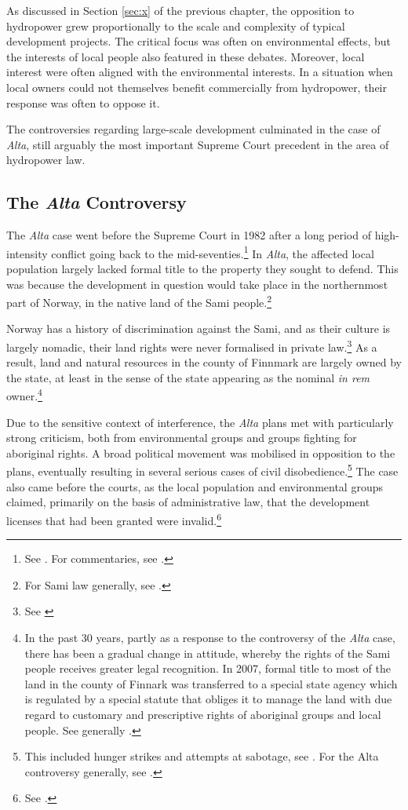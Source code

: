 As discussed in Section \ref{sec:x} of the previous chapter, the opposition to hydropower grew proportionally to the scale and complexity of typical development projects. The critical focus was often on environmental effects, but the interests of local people also featured in these debates. 
Moreover, local interest were often aligned with the environmental interests. In a situation when local owners could not themselves benefit commercially  from hydropower, their response was often to oppose it. 

The controversies regarding large-scale development culminated in the case of {\it Alta}, still arguably the most important Supreme Court precedent in the area of hydropower law.

\subsection{The {\it Alta} Controversy}\label{sec:alta}

The {\it Alta} case went before the Supreme Court in 1982 after a long period of high-intensity conflict going back to the mid-seventies.\footnote{See \cite{alta82}. For commentaries, see \cite{eckhoff82,boe83,hagvar88}.} In {\it Alta}, the affected local population largely lacked formal title to the property they sought to defend. This was because the development in question would take place in the northernmost part of Norway, in the native land of the Sami people.\footnote{For Sami law generally, see \cite{skogvang02}.}

Norway has a history of discrimination against the Sami, and as their culture is largely nomadic, their land rights were never formalised in private law.\footnote{See \cite[149-156]{ravna12s}} As a result, land and natural resources in the county of Finnmark are largely owned by the state, at least in the sense of the state appearing as the nominal {\it in rem} owner.\footnote{In the past 30 years, partly as a response to the controversy of the {\it Alta} case, there has been a gradual change in attitude, whereby the rights of the Sami people receives greater legal recognition. In 2007, formal title to most of the land in the county of Finnark was transferred to a special state agency which is regulated by a special statute that obliges it to manage the land with due regard to customary and prescriptive rights of aboriginal groups and local people. See generally \cite{bull08}.}

Due to the sensitive context of interference, the {\it Alta} plans met with particularly strong criticism, both from environmental groups and groups fighting for aboriginal rights. A broad political movement was mobilised in opposition to the plans, eventually resulting in several serious cases of civil disobedience.\footnote{This included hunger strikes and attempts at sabotage, see \cite[80-83]{nilsen08}. For the Alta controversy generally, see \cite{altawiki;hjorthol06}.} The case also came before the courts, as the local population and environmental groups claimed, primarily on the basis of administrative law, that the development licenses that had been granted were invalid.\footnote{See \cite{eckhoff82}.}

